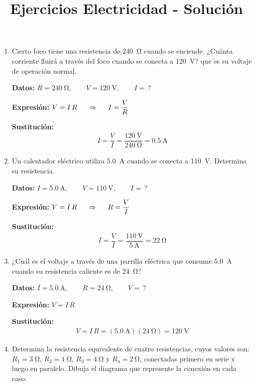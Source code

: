 \documentclass[14pt]{extarticle}
\title{\vspace*{-2cm} Ejercicios Electricidad - Solución \vspace{-5ex}}
\date{}
\begin{document}
\maketitle

\begin{enumerate}
\item Cierto foco tiene una resistencia de \SI{240}{\ohm} cuando se enciende. ¿Cuánta corriente fluirá a través del foco cuando se conecta a \SI{120}{\volt}? que es su voltaje de operación normal.

\textbf{Datos: } $R = \SI{240}{\ohm}, \quad \quad V = \SI{120}{\volt}, \quad \quad I = \, ?$

\textbf{Expresión: } $V = I \, R \hspace{0.5cm} \Rightarrow \hspace{0.5cm} I = \dfrac{V}{R}$

\textbf{Sustitución: }
\begin{align*}
I = \dfrac{V}{I} = \dfrac{\SI{120}{\volt}}{\SI{240}{\ohm}} = \SI{0.5}{\ampere}
\end{align*}
\item Un calentador eléctrico utiliza \SI{5.0}{\ampere} cuando se conecta a \SI{110}{\volt}. Determina su resistencia.

\textbf{Datos: } $I = \SI{5.0}{\ampere}, \quad \quad V = \SI{110}{\volt}, \quad \quad I = \, ?$

\textbf{Expresión: } $V = I \, R \hspace{0.5cm} \Rightarrow \hspace{0.5cm} R = \dfrac{V}{I}$

\textbf{Sustitución: }
\begin{align*}
I = \dfrac{V}{I} = \dfrac{\SI{110}{\volt}}{\SI{5}{\ampere}} = \SI{22}{\ohm}
\end{align*}
\item ¿Cuál es el voltaje a través de una parrilla eléctrica que consume \SI{5.0}{\ampere} cuando su resistencia caliente es de \SI{24}{\ohm}?

\textbf{Datos: } $I = \SI{5.0}{\ampere}, \quad \quad R = \SI{24}{\ohm}, \quad \quad V = \, ?$

\textbf{Expresión: } $V = I \, R$

\textbf{Sustitución: }
\begin{align*}
V = I \, R = (\SI{5.0}{\ampere}) (\SI{24}{\ohm}) = \SI{120}{\volt}
\end{align*}
\item Determina la resistencia equivalente de cuatro resistencias, cuyos valores son: $R_{1} = \SI{3}{\ohm}$, $R_{2} = \SI{1}{\ohm}$, $R_{3} = \SI{4}{\ohm}$ y $R_{4} = \SI{2}{\ohm}$, conectadas primero en  serie y luego en paralelo. Dibuja el diagrama que represente la conexión en cada caso.


\end{enumerate}
\end{document}
